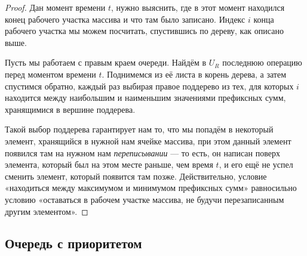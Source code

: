 \begin{proof}
	Дан момент времени $t$, нужно выяснить, где в этот момент находился конец рабочего участка массива и что там было записано. Индекс $i$ конца рабочего участка мы можем посчитать, спустившись по дереву, как описано выше.

	Пусть мы работаем с правым краем очереди. Найдём в $U_R$ последнюю операцию перед моментом времени $t$. Поднимемся из её листа в корень дерева, а затем спустимся обратно, каждый раз выбирая правое поддерево из тех, для которых $i$ находится между наибольшим и наименьшим значениями префиксных сумм, хранящимися в вершине поддерева.

	Такой выбор поддерева гарантирует нам то, что мы попадём в некоторый элемент, хранящийся в нужной нам ячейке массива, при этом данный элемент появился там на нужном нам {\it переписывании} — то есть, он написан поверх элемента, который был на этом месте раньше, чем время $t$, и его ещё не успел сменить элемент, который появится там позже. Действительно, условие «находиться между максимумом и минимумом префиксных сумм» равносильно условию «оставаться в рабочем участке массива, не будучи перезаписанным другим элементом».
\end{proof}

\subsection{Очередь с приоритетом}
